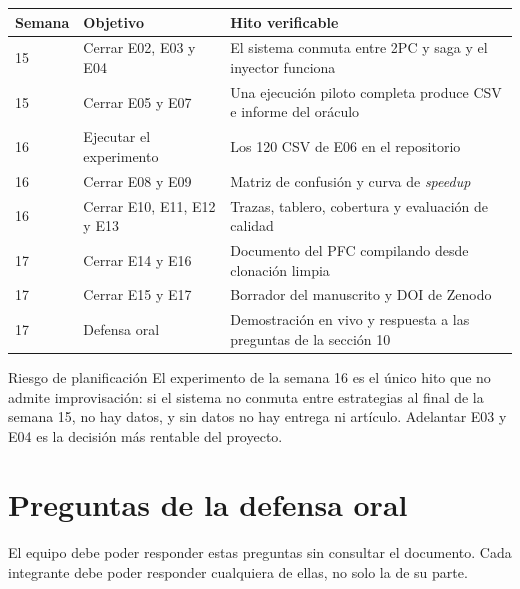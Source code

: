 \documentclass[11pt,a4paper]{article}
\begin{document}
\begin{center}
	\small
	\begin{tabular}{@{}p{1.8cm}p{6.4cm}p{6.6cm}@{}}
		\toprule
		\textbf{Semana} & \textbf{Objetivo} & \textbf{Hito verificable} \\
		\midrule
		15 & Cerrar E02, E03 y E04 & El sistema conmuta entre 2PC y saga y el inyector funciona \\
		15 & Cerrar E05 y E07 & Una ejecución piloto completa produce CSV e informe del oráculo \\
		16 & Ejecutar el experimento & Los 120 CSV de E06 en el repositorio \\
		16 & Cerrar E08 y E09 & Matriz de confusión y curva de \emph{speedup} \\
		16 & Cerrar E10, E11, E12 y E13 & Trazas, tablero, cobertura y evaluación de calidad \\
		17 & Cerrar E14 y E16 & Documento del PFC compilando desde clonación limpia \\
		17 & Cerrar E15 y E17 & Borrador del manuscrito y DOI de Zenodo \\
		17 & Defensa oral & Demostración en vivo y respuesta a las preguntas de la sección 10 \\
		\bottomrule
	\end{tabular}
\end{center}

\begin{alerta}{Riesgo de planificación}
	El experimento de la semana 16 es el único hito que no admite improvisación: si el sistema no conmuta entre estrategias al final de la semana 15, no hay datos, y sin datos no hay entrega ni artículo. Adelantar E03 y E04 es la decisión más rentable del proyecto.
\end{alerta}

\section{Preguntas de la defensa oral}

El equipo debe poder responder estas preguntas sin consultar el documento. Cada integrante debe poder responder cualquiera de ellas, no solo la de su parte.
\end{document}
